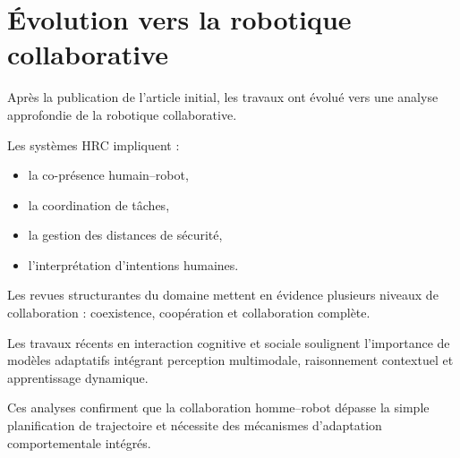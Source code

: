 \section{Évolution vers la robotique collaborative}

Après la publication de l’article initial, les travaux ont évolué vers une analyse approfondie de la robotique collaborative.

Les systèmes HRC impliquent :
\begin{itemize}
    \item la co-présence humain–robot,
    \item la coordination de tâches,
    \item la gestion des distances de sécurité,
    \item l’interprétation d’intentions humaines.
\end{itemize}

Les revues structurantes du domaine \cite{hrc_synthesis} mettent en évidence plusieurs niveaux de collaboration : coexistence, coopération et collaboration complète.

Les travaux récents en interaction cognitive et sociale \cite{access_2024} soulignent l’importance de modèles adaptatifs intégrant perception multimodale, raisonnement contextuel et apprentissage dynamique.

Ces analyses confirment que la collaboration homme–robot dépasse la simple planification de trajectoire et nécessite des mécanismes d’adaptation comportementale intégrés.
